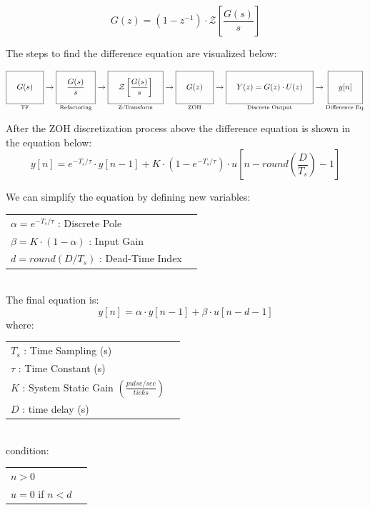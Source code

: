 \documentclass[border={10pt, 10pt, 10pt, 10pt}]{standalone}
\begin{document}
    \begin{minipage}{20cm}
    \[
        G(z) = (1 - z^{-1}) \cdot \mathcal{Z} \left[ \frac{G(s)}{s} \right]
    \]
    
    The steps to find the difference equation are visualized below:

    \[
        \underset{\text{TF}}{\boxed{\rule[-15pt]{0pt}{35pt} \quad G(s) \quad}} 
        \to \underset{\text{Refactoring}}{\boxed{\rule[-15pt]{0pt}{35pt} \quad \frac{G(s)}{s} \quad}} 
        \to \underset{\text{Z-Transform}}{\boxed{\rule[-15pt]{0pt}{35pt} \quad \mathcal{Z} \left[ \frac{G(s)}{s} \right] \quad}} 
        \to \underset{\text{ZOH}}{\boxed{\rule[-15pt]{0pt}{35pt} \quad G(z) \quad}} 
        \to \underset{\text{Discrete Output}}{\boxed{\rule[-15pt]{0pt}{35pt} \quad Y(z) = G(z) \cdot U(z) \quad}} 
        \to \underset{\text{Difference Eq.}}{\boxed{\rule[-15pt]{0pt}{35pt} \quad y[n] \quad}} 
    \]

    After the ZOH discretization process above the difference equation is shown in the equation below:
    \[
        y[n] = e^{-T_s/\tau} \cdot y[n-1] + K \cdot (1 - e^{-T_s/\tau}) \cdot u[n-round(\frac{D}{T_s})-1]
    \]

    We can simplify the equation by defining new variables: 
    
    \begin{tabular}{l l}
        $\alpha = e^{-T_s/\tau}$ : Discrete Pole \\
        $\beta = K \cdot (1 - \alpha)$ : Input Gain \\
        $d = round(D/T_s)$ : Dead-Time Index \\
    \end{tabular} \\

    The final equation is:
    \[
        \boxed{\quad y[n] = \alpha \cdot y[n-1] + \beta \cdot u[n-d-1] \quad}
    \]
    where: \\
        \begin{tabular}{l l}    
            $T_s$ : Time Sampling (s) \\
            $\tau$ : Time Constant (s) \\
            $K$ : System Static Gain $\left( \frac{pulse/sec}{ticks} \right)$ \\
            $D$ : time delay (s) \\
        \end{tabular} \\
    
    condition: \\
        \begin{tabular}{l l}    
            $n > 0$ \\
            $u= 0$ if $n < d$ \\
        \end{tabular}
    \end{minipage}
\end{document}
